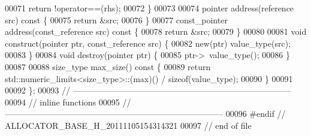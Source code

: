 \begin{DoxyCode}
00071         \textcolor{keywordflow}{return} !operator==(rhs);
00072     \}
00073 
00074     pointer address(reference src)\textcolor{keyword}{ const }\{
00075         \textcolor{keywordflow}{return} &src;
00076     \}
00077     const\_pointer address(const\_reference src)\textcolor{keyword}{ const }\{
00078         \textcolor{keywordflow}{return} &src;
00079     \}
00080 
00081     \textcolor{keywordtype}{void} construct(pointer ptr, const\_reference src) \{
00082         \textcolor{keyword}{new}(ptr) value\_type(src);
00083     \}
00084     \textcolor{keywordtype}{void} destroy(pointer ptr) \{
00085         ptr->~value\_type();
00086     \}
00087 
00088     size\_type max\_size()\textcolor{keyword}{ const }\{
00089         \textcolor{keywordflow}{return} std::numeric\_limits<size\_type>::(max)() / \textcolor{keyword}{sizeof}(value\_type);
00090     \}
00091 
00092 \};
00093 \textcolor{comment}{//
      ------------------------------------------------------------------------------}
00094 \textcolor{comment}{// inline functions}
00095 \textcolor{comment}{//
      ------------------------------------------------------------------------------}
00096 \textcolor{preprocessor}{#endif // ALLOCATOR\_BASE\_H\_20111105154314321}
00097 \textcolor{preprocessor}{}\textcolor{comment}{// end of file}
\end{DoxyCode}
